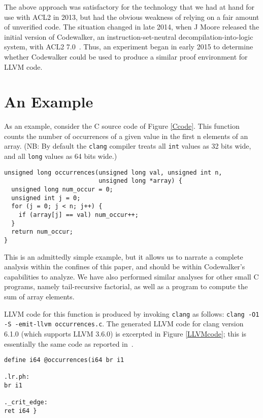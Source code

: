 \documentclass{eptcs}
\begin{document}
The above approach was satisfactory for the technology that we had at 
hand for use with ACL2 in 2013, but had the obvious weakness of relying on a fair amount
of unverified code.  The situation changed in late 2014, when J Moore 
released the initial version of Codewalker, an instruction-set-neutral
decompilation-into-logic system, with ACL2 7.0~\cite{Codewalker}.   
Thus, an experiment began in early 2015 
to determine whether Codewalker could be used to produce a similar proof
environment for LLVM code.

\section{An Example}\label{example}

As an example, consider the C source code of Figure \ref{Ccode}.
This function counts the number of occurrences of a given value in the
first n elements of an array.  (NB: By default the \texttt{clang} compiler
treats all \texttt{int} values as 32 bits wide, and all \texttt{long}
values as 64 bits wide.)

\begin{figure*}
\begin{verbatim}
unsigned long occurrences(unsigned long val, unsigned int n, 
                          unsigned long *array) {
  unsigned long num_occur = 0;
  unsigned int j = 0;
  for (j = 0; j < n; j++) {
    if (array[j] == val) num_occur++;
  }
  return num_occur;
}
\end{verbatim}
\hrulefill
\caption{Example C code to count occurrences of an input value in an array.}
\label{Ccode}
\end{figure*}

This is an admittedly simple example, but it 
allows us to narrate a complete analysis within 
the confines of this paper, and should be within Codewalker's 
capabilities to analyze.  We have also performed similar analyses for
other small C programs, namely tail-recursive factorial, as well as  
a program to compute the sum of array elements.

LLVM code for this function is produced by invoking \texttt{clang}
as follows: \texttt{clang -O1 -S -emit-llvm occurrences.c}.  The
generated LLVM code for clang version 6.1.0 (which supports LLVM 3.6.0) is
excerpted in Figure \ref{LLVMcode}; this is essentially the same code
as reported in~\cite{HardinACL214}.

\begin{figure*}
\begin{verbatim}
define i64 @occurrences(i64 br i1 

.lr.ph:
br i1 

._crit_edge:
ret i64 }
\end{verbatim}
\hrulefill
\caption{LLVM code for the occurrences example.}
\label{LLVMcode}
\end{figure*}
\end{document}

